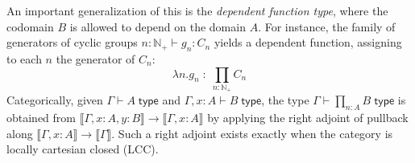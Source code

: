 \documentclass[10pt]{article}
\let\jdeq\equiv
\def\ty{\;\mathsf{type}}
\def\m#1{\llbracket#1\rrbracket}
\def\Np{\mathbb{N}_+}
\def\tprod{\textstyle\prod}
\def\types{\vdash}
\def\equiv{\mathsf{Equiv}}
\numberwithin{equation}{section}
\begin{document}
An important generalization of this is the \emph{dependent function type}, where the codomain $B$ is allowed to depend on the domain $A$.
For instance, the family of generators of cyclic groups $n:\Np \types g_n : C_n$ yields a dependent function, assigning to each $n$ the generator of $C_n$:
\[ \lambda n.g_n \;:\; \tprod_{n:\Np} C_n \]
Categorically, 
given $\Gamma\types A\ty$ and $\Gamma,x:A\types B\ty$, the type $\Gamma\types \tprod_{n:A} B \ty$ is obtained from $\m{\Gamma,x:A,y:B} \to \m{\Gamma,x:A}$ by applying the right adjoint of pullback along $\m{\Gamma,x:A} \to \m{\Gamma}$.
Such a right adjoint exists exactly when the category is locally cartesian closed (LCC).
\end{document}
